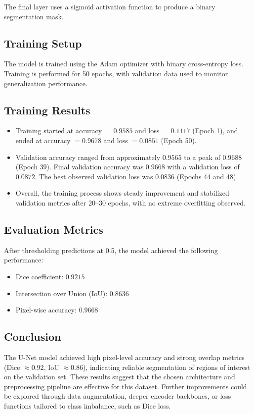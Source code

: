 \documentclass[conference]{IEEEtran}
\begin{document}
The final layer uses a sigmoid activation function to produce a binary segmentation mask.

\subsection{Training Setup}

The model is trained using the Adam optimizer with binary cross-entropy loss. Training is performed for 50 epochs, with validation data used to monitor generalization performance.

\subsection{Training Results}

\begin{itemize}
    \item Training started at accuracy $= 0.9585$ and loss $= 0.1117$ (Epoch 1), and ended at accuracy $= 0.9678$ and loss $= 0.0851$ (Epoch 50).
    \item Validation accuracy ranged from approximately $0.9565$ to a peak of $0.9688$ (Epoch 39). Final validation accuracy was $0.9668$ with a validation loss of $0.0872$. The best observed validation loss was $0.0836$ (Epochs 44 and 48).
    \item Overall, the training process shows steady improvement and stabilized validation metrics after 20--30 epochs, with no extreme overfitting observed.
\end{itemize}

\subsection{Evaluation Metrics}

After thresholding predictions at 0.5, the model achieved the following performance:
\begin{itemize}
    \item Dice coefficient: $0.9215$
    \item Intersection over Union (IoU): $0.8636$
    \item Pixel-wise accuracy: $0.9668$
\end{itemize}

\subsection{Conclusion}

The U-Net model achieved high pixel-level accuracy and strong overlap metrics (Dice $\approx 0.92$, IoU $\approx 0.86$), indicating reliable segmentation of regions of interest on the validation set. These results suggest that the chosen architecture and preprocessing pipeline are effective for this dataset. Further improvements could be explored through data augmentation, deeper encoder backbones, or loss functions tailored to class imbalance, such as Dice loss.
\end{document}
